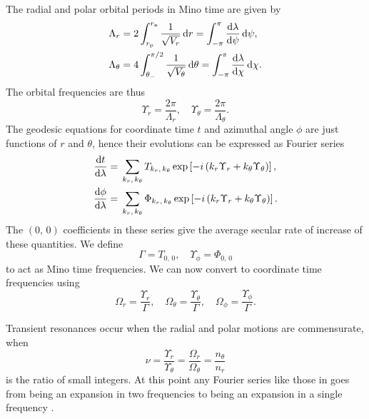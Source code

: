 The radial and polar orbital periods in Mino time are given by
\begin{subequations}
\begin{align}
\Lambda_r = {} & 2\int_{r_\mathrm{p}}^{r_\mathrm{a}}{\dfrac{1}{\sqrt{V_r}}}\,\mathrm{d}{r} = \int_{-\pi}^{\pi}{\dfrac{\mathrm{d} {\lambda}}{\mathrm{d} {\psi}}}\,\mathrm{d}{\psi}, \\
\Lambda_\theta = {} & 4\int_{\theta_-}^{\pi/2}{\dfrac{1}{\sqrt{V_\theta}}}\,\mathrm{d}{\theta} = \int_{-\pi}^{\pi}{\dfrac{\mathrm{d} {\lambda}}{\mathrm{d} {\chi}}}\,\mathrm{d}{\chi}.
\end{align}
\end{subequations}
The orbital frequencies are thus
\begin{equation}
\Upsilon_r = \dfrac{2\pi}{\Lambda_r}, \quad \Upsilon_\theta = \dfrac{2\pi}{\Lambda_\theta}.
\end{equation}
The geodesic equations for coordinate time $t$ and azimuthal angle $\phi$ are just functions of $r$ and $\theta$, hence their evolutions can be expressed as Fourier series \citep{Drasco2005}
\begin{subequations}
\begin{align}
\dfrac{\mathrm{d} {t}}{\mathrm{d} {\lambda}} = {} & \sum_{k_r,\,k_\theta}T_{k_r,\, k_\theta}\exp\left[-i\left(k_r\Upsilon_r + k_\theta\Upsilon_\theta\right)\right], \\
\dfrac{\mathrm{d} {\phi}}{\mathrm{d} {\lambda}} = {} & \sum_{k_r,\,k_\theta}\Phi_{k_r,\, k_\theta}\exp\left[-i\left(k_r\Upsilon_r + k_\theta\Upsilon_\theta\right)\right].
\label{eq:Mino-Fourier}
\end{align}
\end{subequations}
The $(0,\,0)$ coefficients in these series give the average secular rate of increase of these quantities. We define
\begin{equation}
\Gamma = T_{0,\,0}, \quad \Upsilon_\phi = \Phi_{0,\,0}
\end{equation}
to act as Mino time frequencies. We can now convert to coordinate time frequencies using
\begin{equation}
\Omega_r = \dfrac{\Upsilon_r}{\Gamma}, \quad \Omega_\theta = \dfrac{\Upsilon_\theta}{\Gamma}, \quad \Omega_\phi = \dfrac{\Upsilon_\phi}{\Gamma}.
\end{equation}

Transient resonances occur when the radial and polar motions are commensurate, when
\begin{equation}
\nu = \dfrac{\Upsilon_r}{\Upsilon_\theta} = \dfrac{\Omega_r}{\Omega_\theta} = \dfrac{n_\theta}{n_r}
\end{equation}
is the ratio of small integers. At this point any Fourier series like those in  goes from being an expansion in two frequencies to being an expansion in a single frequency \citep{Bosley1992}.

